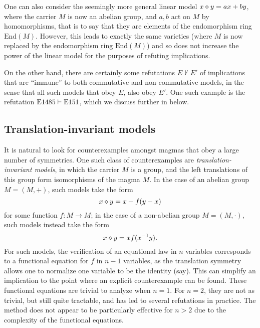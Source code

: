 \begin{remark} One can also consider the seemingly more general linear model $x \diamond y = ax + by$, where the carrier $M$ is now an abelian group, and $a,b$ act on $M$ by homomorphisms, that is to say that they are elements of the endomorphism ring $\mathrm{End}(M)$.  However, this leads to exactly the same varieties  (where $M$ is now replaced by the endomorphism ring $\mathrm{End}(M)$) and so does not increase the power of the linear model for the purposes of refuting implications.
\end{remark}

On the other hand, there are certainly some refutations $E \nvdash E'$ of implications that are ``immune'' to both commutative and non-commutative models, in the sense that all such models that obey $E$, also obey $E'$.  One such example is the refutation $\mathrm{E}1485 \vdash \mathrm{E}151$, which we discuss further in  below.

\subsection{Translation-invariant models}\label{translation-sec}

It is natural to look for counterexamples amongst magmas that obey a large number of symmetries.  One such class of counterexamples are \emph{translation-invariant models}, in which the carrier $M$ is a group, and the left translations of this group form isomorphisms of the magma $M$.  In the case of an abelian group $M = (M,+)$, such models take the form
\begin{equation}\label{xop-add}
  x \diamond y = x + f(y-x)
\end{equation}
for some function $f \colon M \to M$; in the case of a non-abelian group $M = (M,\cdot)$, such models instead take the form
\begin{equation}\label{xop-mul}
x \diamond y = x f(x^{-1} y).
\end{equation}
For such models, the verification of an equational law in $n$ variables corresponds to a functional equation for $f$ in $n-1$ variables, as the translation symmetry allows one to normalize one variable to be the identity (say). This can simplify an implication to the point where an explicit counterexample can be found.  These functional equations are trivial to analyze when $n=1$.  For $n=2$, they are not as trivial, but still quite tractable, and has led to several refutations in practice.  The method does not appear to be particularly effective for $n>2$ due to the complexity of the functional equations.

